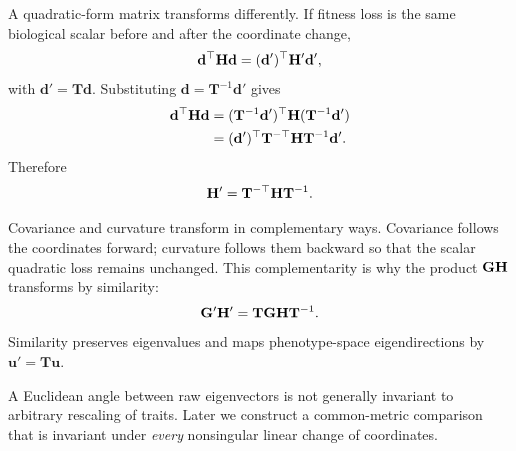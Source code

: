 A quadratic-form matrix transforms differently. If fitness loss is the same biological scalar before and after the coordinate change,
\begin{equation}
\mathbf d^\top\mathbf{H}\mathbf d
=(\mathbf d')^\top\mathbf{H}'\mathbf d',
\end{equation}
with \(\mathbf d'=\mathbf T\mathbf d\). Substituting \(\mathbf d=\mathbf T^{-1}\mathbf d'\) gives
\begin{align}
\mathbf d^\top\mathbf{H}\mathbf d
&=(\mathbf T^{-1}\mathbf d')^\top\mathbf{H}(\mathbf T^{-1}\mathbf d')\\
&=(\mathbf d')^\top\mathbf T^{-\top}\mathbf{H}\mathbf T^{-1}\mathbf d'.
\end{align}
Therefore
\begin{equation}
\mathbf{H}'=\mathbf T^{-\top}\mathbf{H}\mathbf T^{-1}.
\label{eq:Htransform}
\end{equation}

\begin{geombox}
Covariance and curvature transform in complementary ways. Covariance follows the coordinates forward; curvature follows them backward so that the scalar quadratic loss remains unchanged. This complementarity is why the product \(\mathbf{G}\mathbf{H}\) transforms by similarity:
\[
\mathbf{G}'\mathbf{H}'=\mathbf T\mathbf{G}\mathbf{H}\mathbf T^{-1}.
\]
Similarity preserves eigenvalues and maps phenotype-space eigendirections by \(\mathbf u' = \mathbf T\mathbf u\).
\end{geombox}

\begin{cautionbox}
A Euclidean angle between raw eigenvectors is not generally invariant to arbitrary rescaling of traits. Later we construct a common-metric comparison that is invariant under \emph{every} nonsingular linear change of coordinates.
\end{cautionbox}
